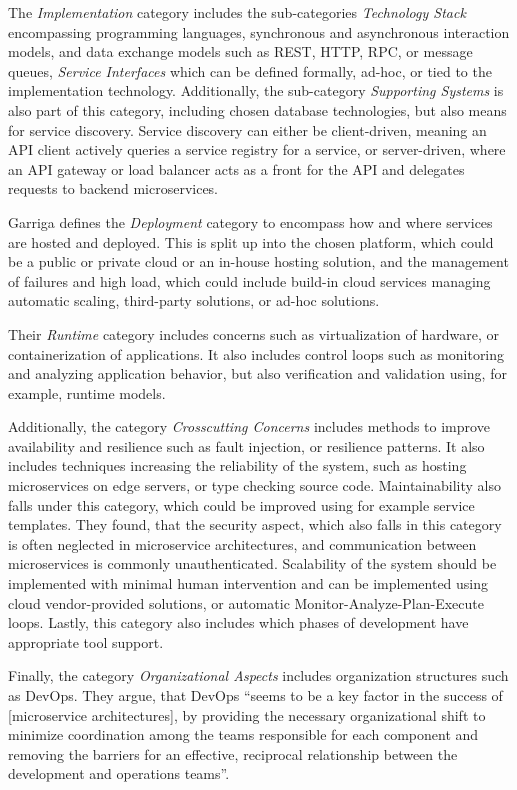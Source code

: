 The \textit{Implementation} category includes the sub-categories \textit{Technology Stack} encompassing programming languages, synchronous and asynchronous interaction models, and data exchange models such as \ac{REST}, \ac{HTTP}, \ac{RPC}, or message queues, \textit{Service Interfaces} which can be defined formally, ad-hoc, or tied to the implementation technology.
Additionally, the sub-category \textit{Supporting Systems} is also part of this category, including chosen database technologies, but also means for service discovery.
Service discovery can either be client-driven, meaning an \ac{API} client actively queries a service registry for a service, or server-driven, where an \ac{API} gateway or load balancer acts as a front for the \ac{API} and delegates requests to backend microservices.

Garriga defines the \textit{Deployment} category to encompass how and where services are hosted and deployed.
This is split up into the chosen platform, which could be a public or private cloud or an in-house hosting solution, and the management of failures and high load, which could include build-in cloud services managing automatic scaling, third-party solutions, or ad-hoc solutions.

Their \textit{Runtime} category includes concerns such as virtualization of hardware, or containerization of applications.
It also includes control loops such as monitoring and analyzing application behavior, but also verification and validation using, for example, runtime models.

Additionally, the category \textit{Crosscutting Concerns} includes methods to improve availability and resilience such as fault injection, or resilience patterns.
It also includes techniques increasing the reliability of the system, such as hosting microservices on edge servers, or type checking source code.
Maintainability also falls under this category, which could be improved using for example service templates.
They found, that the security aspect, which also falls in this category is often neglected in microservice architectures, and communication between microservices is commonly unauthenticated.
Scalability of the system should be implemented with minimal human intervention and can be implemented using cloud vendor-provided solutions, or automatic Monitor-Analyze-Plan-Execute loops.
Lastly, this category also includes which phases of development have appropriate tool support.

Finally, the category \textit{Organizational Aspects} includes organization structures such as {DevOps}.
They argue, that DevOps ``seems to be a key factor in the success of [microservice architectures], by providing the necessary organizational shift to minimize coordination among the teams responsible for each component and removing the barriers for an effective, reciprocal relationship between the development and operations teams''.

